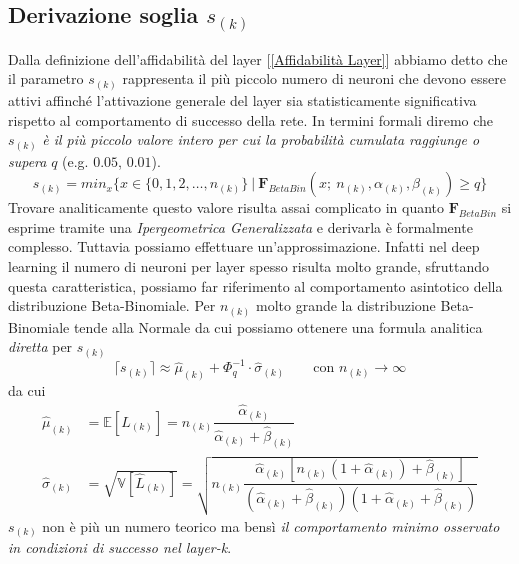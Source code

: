 \documentclass[10pt]{article} %
\begin{document}
\subsection{Derivazione soglia $s_{(k)}$}
Dalla definizione dell'affidabilità del layer [\ref{Affidabilità Layer}] abbiamo detto che il parametro $s_{(k)}$ rappresenta il più piccolo numero di neuroni che devono essere attivi affinché l'attivazione generale del layer sia statisticamente significativa rispetto al comportamento di successo della rete. In termini formali diremo che $s_{(k)}$ \textit{è il più piccolo valore intero per cui la probabilità cumulata raggiunge o supera} $q$ (e.g. $0.05$, $0.01$).
\begin{equation}
    s_{(k)} = min_{x}\{ x\in \{0,1, 2, \dots, n_{(k)}\}\ |\ \mathbf{F}_{BetaBin}(x;\ n_{(k)},\alpha_{(k)}, \beta_{(k)})\ge q\}
\end{equation}
Trovare analiticamente questo valore risulta assai complicato in quanto $\mathbf{F}_{BetaBin}$ si esprime tramite una \textit{Ipergeometrica Generalizzata} e derivarla è formalmente complesso. Tuttavia possiamo effettuare un'approssimazione. Infatti nel deep learning il numero di neuroni per layer spesso risulta molto grande, sfruttando questa caratteristica, possiamo far riferimento al comportamento asintotico della distribuzione Beta-Binomiale. Per $n_{(k)}$ molto grande la distribuzione Beta-Binomiale tende alla Normale da cui possiamo ottenere una formula analitica \textit{diretta} per $s_{(k)}$
\begin{equation}\label{soglia sk}
    \lceil s_{(k)}\rceil \approx \hat{\mu}_{(k)} + \Phi^{-1}_q\cdot\hat{\sigma}_{(k)} \qquad \text{con } n_{(k)}\rightarrow \infty
\end{equation}
da cui
\begin{align}
    \hat{\mu}_{(k)} &= \mathbb{E}[\hat{L}_{(k)}] = n_{(k)}\dfrac{\hat{\alpha}_{(k)}}{\hat{\alpha}_{(k)}+\hat{\beta}_{(k)}}\\
    \hat{\sigma}_{(k)} &= \sqrt{\mathbb{V}[\hat{L}_{(k)}]} = \sqrt{n_{(k)}\dfrac{\hat{\alpha}_{(k)}[n_{(k)}(1+\hat{\alpha}_{(k)})+\hat{\beta}_{(k)}]}{(\hat{\alpha}_{(k)}+\hat{\beta}_{(k)})(1+\hat{\alpha}_{(k)}+\hat{\beta}_{(k)})}}
\end{align}
$s_{(k)}$ non è più un numero teorico ma bensì \textit{il comportamento minimo osservato in condizioni di successo nel layer-k}.
\end{document}
